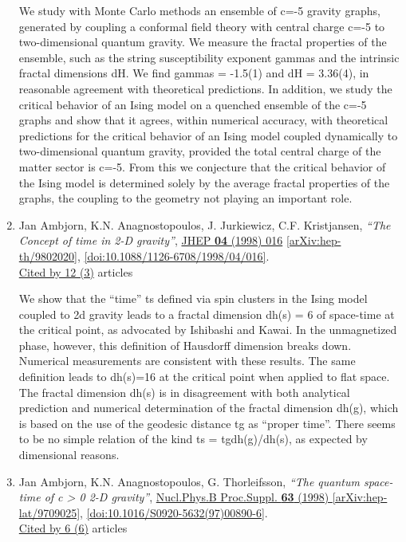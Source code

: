 \documentclass[a4paper,10pt]{article}
\begin{document}
\begin{enumerate}
We study with Monte Carlo methods an ensemble of c=-5 gravity graphs, generated by coupling a conformal field theory with central charge c=-5 to two-dimensional quantum gravity. We measure the fractal properties of the ensemble, such as the string susceptibility exponent gammas and the intrinsic fractal dimensions dH. We find gammas = -1.5(1) and dH = 3.36(4), in reasonable agreement with theoretical predictions. In addition, we study the critical behavior of an Ising model on a quenched ensemble of the c=-5 graphs and show that it agrees, within numerical accuracy, with theoretical predictions for the critical behavior of an Ising model coupled dynamically to two-dimensional quantum gravity, provided the total central charge of the matter sector is c=-5. From this we conjecture that the critical behavior of the Ising model is determined solely by the average fractal properties of the graphs, the coupling to the geometry not playing an important role.
\item Jan Ambjorn, K.N. Anagnostopoulos, J. Jurkiewicz, C.F. Kristjansen, {\it ``The Concept of time in 2-D gravity''}, \href{https://www.doi.org/10.1088/1126-6708/1998/04/016}{JHEP {\bf 04} (1998) 016} \href{https://arxiv.org/abs/hep-th/9802020}{[arXiv:hep-th/9802020]}, \href{https://www.doi.org/10.1088/1126-6708/1998/04/016}{[doi:10.1088/1126-6708/1998/04/016]}.
\\\href{https://inspirehep.net/literature/?q=refersto%3Arecid%3A466869}{Cited by 12 (3)} articles

We show that the ``time'' ts defined via spin clusters in the Ising model coupled to 2d gravity leads to a fractal dimension dh(s) = 6 of space-time at the critical point, as advocated by Ishibashi and Kawai. In the unmagnetized phase, however, this definition of Hausdorff dimension breaks down. Numerical measurements are consistent with these results. The same definition leads to dh(s)=16 at the critical point when applied to flat space. The fractal dimension dh(s) is in disagreement with both analytical prediction and numerical determination of the fractal dimension dh(g), which is based on the use of the geodesic distance tg as ``proper time''. There seems to be no simple relation of the kind ts = tg{dh(g)/dh(s)}, as expected by dimensional reasons.
\item Jan Ambjorn, K.N. Anagnostopoulos, G. Thorleifsson, {\it ``The quantum space-time of c > 0 2-D gravity''}, \href{https://www.doi.org/10.1016/S0920-5632(97)00890-6}{Nucl.Phys.B Proc.Suppl. {\bf 63} (1998) } \href{https://arxiv.org/abs/hep-lat/9709025}{[arXiv:hep-lat/9709025]}, \href{https://www.doi.org/10.1016/S0920-5632(97)00890-6}{[doi:10.1016/S0920-5632(97)00890-6]}.
\\\href{https://inspirehep.net/literature/?q=refersto%3Arecid%3A448238}{Cited by 6 (6)} articles


\end{enumerate}
\end{document}
